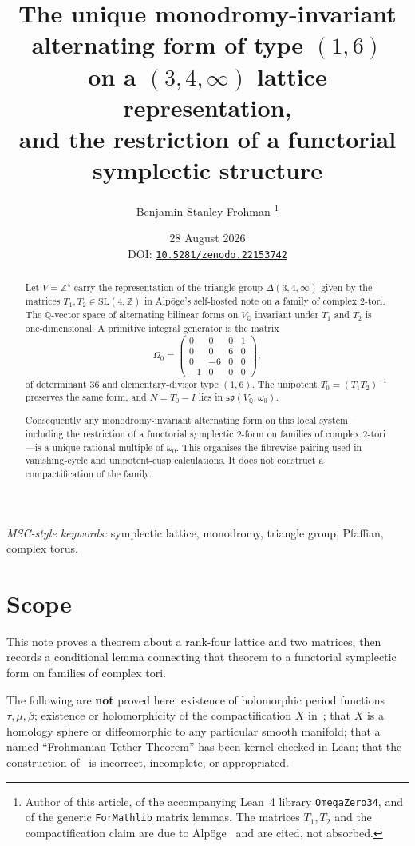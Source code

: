 \documentclass[11pt,a4paper]{article}
\title{The unique monodromy-invariant alternating form of type $(1,6)$\\
on a $(3,4,\infty)$ lattice representation,\\
and the restriction of a functorial symplectic structure}
\author{Benjamin Stanley Frohman%
\thanks{Author of this article, of the accompanying Lean~4 library
\texttt{OmegaZero34}, and of the generic \texttt{ForMathlib} matrix lemmas.
The matrices \(T_1,T_2\) and the compactification claim are due to
Alp\"oge~\protect\cite{AlpogeS6} and are cited, not absorbed.}}
\date{28 August 2026\\[4pt]
\normalsize DOI: \href{https://doi.org/10.5281/zenodo.22153742}{\texttt{10.5281/zenodo.22153742}}}
\theoremstyle{definition}
\theoremstyle{remark}
\newcommand{\Q}{\mathbb{Q}}
\newcommand{\Z}{\mathbb{Z}}
\newcommand{\spq}{\mathfrak{sp}}
\begin{document}
\maketitle

\begin{abstract}
Let $V=\Z^4$ carry the representation of the triangle group $\Delta(3,4,\infty)$ given by the matrices $T_1,T_2\in\mathrm{SL}(4,\Z)$ in Alp\"oge's self-hosted note on a family of complex $2$-tori. The $\Q$-vector space of alternating bilinear forms on $V_{\Q}$ invariant under $T_1$ and $T_2$ is one-dimensional. A primitive integral generator is the matrix
\[
\Omega_0=\begin{pmatrix}0&0&0&1\\0&0&6&0\\0&-6&0&0\\-1&0&0&0\end{pmatrix},
\]
of determinant $36$ and elementary-divisor type $(1,6)$. The unipotent $T_0=(T_1T_2)^{-1}$ preserves the same form, and $N=T_0-I$ lies in $\spq(V_{\Q},\omega_0)$.

Consequently any monodromy-invariant alternating form on this local system---including the restriction of a functorial symplectic $2$-form on families of complex $2$-tori---is a unique rational multiple of $\omega_0$. This organises the fibrewise pairing used in vanishing-cycle and unipotent-cusp calculations. It does not construct a compactification of the family.
\end{abstract}

\noindent\textit{MSC-style keywords:} symplectic lattice, monodromy, triangle group, Pfaffian, complex torus.

\tableofcontents

\section{Scope}

This note proves a theorem about a rank-four lattice and two matrices, then records a conditional lemma connecting that theorem to a functorial symplectic form on families of complex tori.

The following are \textbf{not} proved here: existence of holomorphic period functions $\tau,\mu,\beta$; existence or holomorphicity of the compactification $X$ in~\cite{AlpogeS6}; that $X$ is a homology sphere or diffeomorphic to any particular smooth manifold; that a named ``Frohmanian Tether Theorem'' has been kernel-checked in Lean; that the construction of~\cite{AlpogeS6} is incorrect, incomplete, or appropriated.
\end{document}
